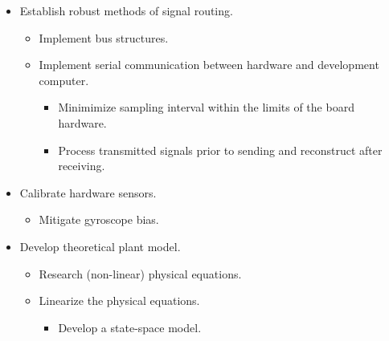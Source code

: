 \documentclass[crop=false,float=true,class=scrreprt]{standalone}
\begin{document}
\begin{enumerate}[leftmargin=*]
\begin{itemize}[leftmargin=*]
  \item Establish robust methods of signal routing.
  \begin{itemize}[leftmargin=*, label=$\vcenter{\hbox{\tiny$\bullet$}}$]
  
    \item Implement bus structures.

    \item Implement serial communication between hardware and development computer.
    \begin{itemize}[leftmargin=*, label=$\cdot$]
    
      \item Minimimize sampling interval within the limits of the board hardware.
      
      \item Process transmitted signals prior to sending and reconstruct after receiving.
    
    \end{itemize}
    
  \end{itemize}



  
  
  \clearpage
  
  
  

  \item Calibrate hardware sensors.
  \begin{itemize}[leftmargin=*, label=$\vcenter{\hbox{\tiny$\bullet$}}$]
  
    \item Mitigate gyroscope bias.
  
  \end{itemize}

  \item Develop theoretical plant model.
  \begin{itemize}[leftmargin=*, label=$\vcenter{\hbox{\tiny$\bullet$}}$]
    
    \item Research (non-linear) physical equations.
    
    \item Linearize the physical equations.
    \begin{itemize}[leftmargin=*, label=$\cdot$]
    
      \item Develop a state-space model.
    
    \end{itemize}
    

\end{itemize}
\end{itemize}
\end{enumerate}
\end{document}
